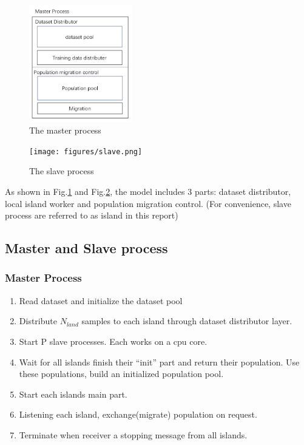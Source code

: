 \documentclass[conference]{IEEEtran}
\begin{document}
  \begin{figure}[H]
    \centering
    \includegraphics[width = 0.4\textwidth]{figures/master.png}
    \caption{The master process}
    \label{fig:master}
  \end{figure}

  \begin{figure}[H]
    \centering
    \texttt{[image: figures/slave.png]}
    \caption{The slave process}
    \label{fig:slave}
  \end{figure}
  
  As shown in Fig.\ref{fig:master} and Fig.\ref{fig:slave}, the model includes 3 parts: dataset distributor, local island worker and population migration control. (For convenience, slave process are referred to as island in this report)
   
  \subsection{Master and Slave process}
  \subsubsection{Master Process}
  
  \begin{enumerate}[leftmargin=4\parindent]
    \item Read dataset and initialize the dataset pool
    \item Distribute $N_{land}$ samples to each island through dataset distributor layer.
    \item Start P slave processes. Each works on a cpu core.
    \item Wait for all islands finish their “init” part and return their population. Use these populations, build an initialized population pool.
    \item Start each islands main part.
    \item Listening each island, exchange(migrate) population on request.
    \item Terminate when receiver a stopping message from all islands.
  \end{enumerate}
\end{document}
